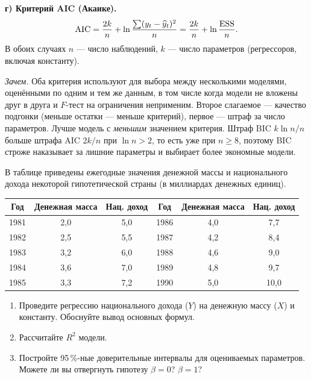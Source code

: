 \begin{solution}
\textbf{г) Критерий AIC (Акаике).}
\[
  \mathrm{AIC} = \frac{2k}{n} + \ln\frac{\sum(y_t - \widehat{y}_t)^2}{n}
               = \frac{2k}{n} + \ln\frac{\mathrm{ESS}}{n}.
\]
В обоих случаях $n$ — число наблюдений, $k$ — число параметров (регрессоров,
включая константу).

\emph{Зачем.} Оба критерия используют для выбора между несколькими моделями,
оценёнными по одним и тем же данным, в том числе когда модели не вложены друг
в друга и $F$-тест на ограничения неприменим. Второе слагаемое — качество
подгонки (меньше остатки — меньше критерий), первое — штраф за число
параметров. Лучше модель с \emph{меньшим} значением критерия. Штраф BIC
$k\ln n/n$ больше штрафа AIC $2k/n$ при $\ln n > 2$, то есть уже при
$n \ge 8$, поэтому BIC строже наказывает за лишние параметры и выбирает более
экономные модели.
\end{solution}

\ifsolutions\clearpage\fi
{}

В таблице приведены ежегодные значения денежной массы и национального дохода
некоторой гипотетической страны (в миллиардах денежных единиц).

\begin{center}
\begin{tabular}{ccc @{\qquad} ccc}
\toprule
Год & Денежная масса & Нац. доход & Год & Денежная масса & Нац. доход \\
\midrule
1981 & 2,0 & 5,0 & 1986 & 4,0 & 7,7 \\
1982 & 2,5 & 5,5 & 1987 & 4,2 & 8,4 \\
1983 & 3,2 & 6,0 & 1988 & 4,6 & 9,0 \\
1984 & 3,6 & 7,0 & 1989 & 4,8 & 9,7 \\
1985 & 3,3 & 7,2 & 1990 & 5,0 & 10,0 \\
\bottomrule
\end{tabular}
\end{center}

\begin{enumerate}[label=\asbuk*), leftmargin=2.2em, itemsep=3pt]
  \item Проведите регрессию национального дохода ($Y$) на денежную массу ($X$)
        и константу. Обоснуйте вывод основных формул.
  \item Рассчитайте $R^2$ модели.
  \item Постройте 95\,\%-ные доверительные интервалы для оцениваемых
        параметров. Можете ли вы отвергнуть гипотезу $\beta = 0$? $\beta = 1$?
\end{enumerate}


